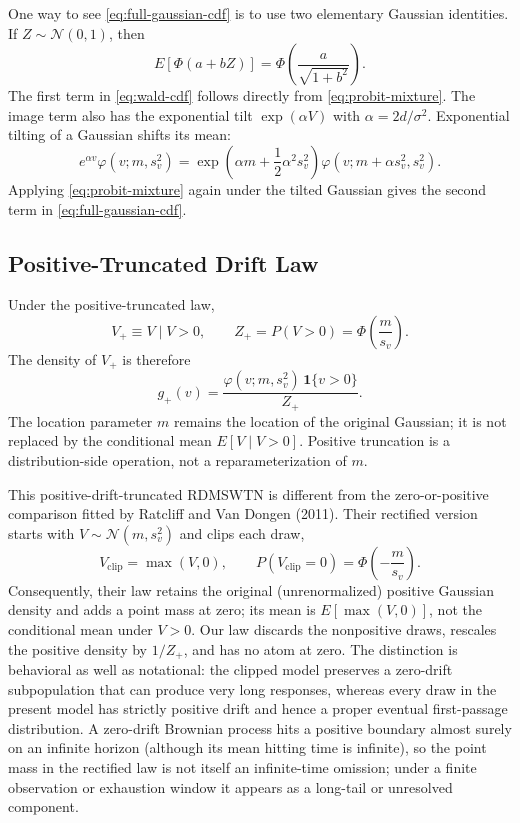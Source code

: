 \documentclass[12pt]{article}
\newcommand{\Normal}{\mathcal{N}}
\newcommand{\PhiN}{\Phi}
\begin{document}
One way to see \eqref{eq:full-gaussian-cdf} is to use two elementary Gaussian identities. If $Z\sim\Normal(0,1)$, then
\begin{equation}
  E\left[\PhiN(a+bZ)\right]
  =\PhiN\!\left(\frac{a}{\sqrt{1+b^2}}\right).
  \label{eq:probit-mixture}
\end{equation}
The first term in \eqref{eq:wald-cdf} follows directly from \eqref{eq:probit-mixture}. The image term also has the exponential tilt $\exp(\alpha V)$ with $\alpha=2d/\sigma^2$. Exponential tilting of a Gaussian shifts its mean:
\begin{equation}
  e^{\alpha v}\varphi(v;m,s_v^2)
  =\exp\!\left(\alpha m+\frac{1}{2}\alpha^2s_v^2\right)
  \varphi(v;m+\alpha s_v^2,s_v^2).
  \label{eq:gaussian-tilt}
\end{equation}
Applying \eqref{eq:probit-mixture} again under the tilted Gaussian gives the second term in \eqref{eq:full-gaussian-cdf}.

\subsection{Positive-Truncated Drift Law}
Under the positive-truncated law,
\begin{equation}
  V_+\equiv V\mid V>0,
  \qquad
  Z_+=P(V>0)=\PhiN\!\left(\frac{m}{s_v}\right).
\end{equation}
The density of $V_+$ is therefore
\begin{equation}
  g_+(v)=\frac{\varphi(v;m,s_v^2)\,\mathbf{1}\{v>0\}}{Z_+}.
\end{equation}
The location parameter $m$ remains the location of the original Gaussian; it is not replaced by the conditional mean $E[V\mid V>0]$. Positive truncation is a distribution-side operation, not a reparameterization of $m$.

This positive-drift-truncated RDMSWTN is different from the zero-or-positive comparison fitted by Ratcliff and Van Dongen (2011). Their rectified version starts with $V\sim\Normal(m,s_v^2)$ and clips each draw,
\begin{equation}
  V_{\mathrm{clip}}=\max(V,0),
  \qquad
  P(V_{\mathrm{clip}}=0)=\PhiN\!\left(-\frac{m}{s_v}\right).
\end{equation}
Consequently, their law retains the original (unrenormalized) positive Gaussian density and adds a point mass at zero; its mean is $E[\max(V,0)]$, not the conditional mean under $V>0$. Our law discards the nonpositive draws, rescales the positive density by $1/Z_+$, and has no atom at zero. The distinction is behavioral as well as notational: the clipped model preserves a zero-drift subpopulation that can produce very long responses, whereas every draw in the present model has strictly positive drift and hence a proper eventual first-passage distribution. A zero-drift Brownian process hits a positive boundary almost surely on an infinite horizon (although its mean hitting time is infinite), so the point mass in the rectified law is not itself an infinite-time omission; under a finite observation or exhaustion window it appears as a long-tail or unresolved component.
\end{document}
